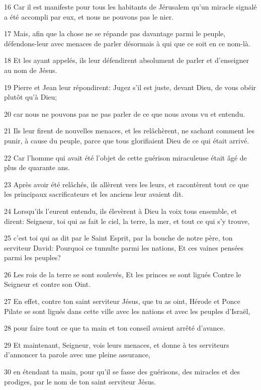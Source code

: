 \par 16 Car il est manifeste pour tous les habitants de Jérusalem qu'un miracle signalé a été accompli par eux, et nous ne pouvons pas le nier.
\par 17 Mais, afin que la chose ne se répande pas davantage parmi le peuple, défendons-leur avec menaces de parler désormais à qui que ce soit en ce nom-là.
\par 18 Et les ayant appelés, ils leur défendirent absolument de parler et d'enseigner au nom de Jésus.
\par 19 Pierre et Jean leur répondirent: Jugez s'il est juste, devant Dieu, de vous obéir plutôt qu'à Dieu;
\par 20 car nous ne pouvons pas ne pas parler de ce que nous avons vu et entendu.
\par 21 Ils leur firent de nouvelles menaces, et les relâchèrent, ne sachant comment les punir, à cause du peuple, parce que tous glorifiaient Dieu de ce qui était arrivé.
\par 22 Car l'homme qui avait été l'objet de cette guérison miraculeuse était âgé de plus de quarante ans.
\par 23 Après avoir été relâchés, ils allèrent vers les leurs, et racontèrent tout ce que les principaux sacrificateurs et les anciens leur avaient dit.
\par 24 Lorsqu'ils l'eurent entendu, ils élevèrent à Dieu la voix tous ensemble, et dirent: Seigneur, toi qui as fait le ciel, la terre, la mer, et tout ce qui s'y trouve,
\par 25 c'est toi qui as dit par le Saint Esprit, par la bouche de notre père, ton serviteur David: Pourquoi ce tumulte parmi les nations, Et ces vaines pensées parmi les peuples?
\par 26 Les rois de la terre se sont soulevés, Et les princes se sont ligués Contre le Seigneur et contre son Oint.
\par 27 En effet, contre ton saint serviteur Jésus, que tu as oint, Hérode et Ponce Pilate se sont ligués dans cette ville avec les nations et avec les peuples d'Israël,
\par 28 pour faire tout ce que ta main et ton conseil avaient arrêté d'avance.
\par 29 Et maintenant, Seigneur, vois leurs menaces, et donne à tes serviteurs d'annoncer ta parole avec une pleine assurance,
\par 30 en étendant ta main, pour qu'il se fasse des guérisons, des miracles et des prodiges, par le nom de ton saint serviteur Jésus.
